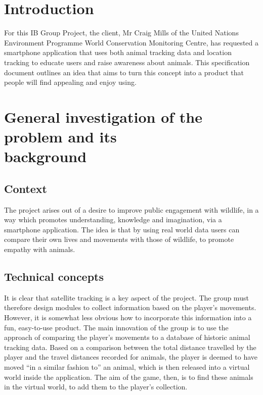\documentclass[12pt,a4paper,twoside]{article}
\begin{document}

\newpage
\pagestyle{empty}
\cleardoublepage                             %
\newpage


\section{Introduction}

For this IB Group Project, the client, Mr Craig Mills of the United Nations Environment Programme World Conservation Monitoring Centre, has requested a smartphone application that uses both animal tracking data and location tracking to educate users and raise awareness about animals. This specification document outlines an idea that aims to turn this concept into a product that people will find appealing and enjoy using.

\section{General investigation of the problem and its \\ background}
\subsection{Context}

The project arises out of a desire to improve public engagement with wildlife, in a way which promotes understanding, knowledge and imagination, via a smartphone application. 
The idea is that by using real world data users can compare their own lives and movements with those of wildlife, to promote empathy with animals.


\subsection{Technical concepts}
It is clear that satellite tracking is a key aspect of the project.
The group must therefore design modules to collect information based on the player's movements.
However, it is somewhat less obvious how to incorporate this information into a fun, easy-to-use product.
The main innovation of the group is to use the approach of comparing the player's movements to a database of historic animal tracking data.
Based on a comparison between the total distance travelled by the player and the travel distances recorded for animals, the player is deemed to have moved ``in a similar fashion to'' an animal, which is then released into a virtual world inside the application.
The aim of the game, then, is to find these animals in the virtual world, to add them to the player's collection.
\end{document}
